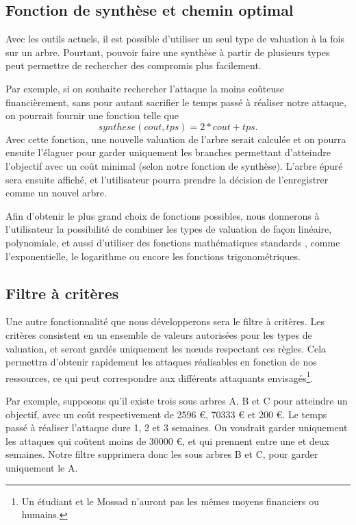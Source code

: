     \subsection{Fonction de synthèse et chemin optimal}
        \label{sec:fct_synth}


        Avec les outils actuels, il est possible d'utiliser un seul type de valuation à la fois sur un arbre. Pourtant, pouvoir faire une synthèse à partir de plusieurs types peut permettre de rechercher des compromis plus facilement.

        Par exemple, si on souhaite rechercher l'attaque la moins coûteuse financièrement, sans pour autant sacrifier le temps passé à réaliser notre attaque, on pourrait fournir une fonction telle que \[ synthese(cout, tps) = 2*cout + tps . \]
        Avec cette fonction, une nouvelle valuation de l'arbre serait calculée et on pourra ensuite l'élaguer pour garder uniquement les branches permettant d'atteindre l'objectif avec un coût minimal (selon notre fonction de synthèse). %
        L'arbre épuré sera ensuite affiché, et l'utilisateur pourra prendre la décision de l'enregistrer comme un nouvel arbre.

        Afin d'obtenir le plus grand choix de fonctions possibles, nous donnerons à l'utilisateur la possibilité de combiner les types de valuation de façon linéaire, polynomiale, et aussi d'utiliser des fonctions mathématiques \og standards \fg, comme l'exponentielle, le logarithme ou encore les fonctions trigonométriques. %

    \subsection{Filtre à critères}
        \label{sec:filtre}

        Une autre fonctionnalité que nous développerons sera le filtre à critères. Les critères consistent en un ensemble de valeurs autorisées pour les types de valuation, et seront gardés uniquement les nœuds respectant ces règles. Cela permettra d'obtenir rapidement les attaques réalisables en fonction de nos ressources, ce qui peut correspondre aux différents attaquants envisagés\footnote{Un étudiant et le Mossad n'auront pas les mêmes moyens financiers ou humains.}.

        Par exemple, supposons qu'il existe trois sous arbres A, B et C pour atteindre un objectif, avec un coût respectivement de 2596 €, 70333 € et 200 €. Le temps passé à réaliser l'attaque dure 1, 2 et 3 semaines. On voudrait garder uniquement les attaques qui coûtent moins de 30000 €, et qui prennent entre une et deux semaines. Notre filtre supprimera donc les sous arbres B et C, pour garder uniquement le A.

